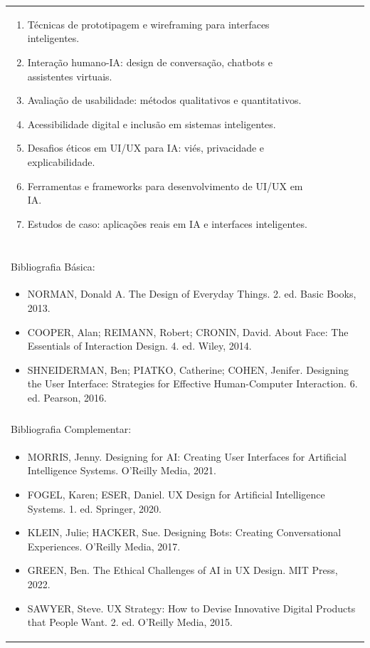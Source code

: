 \documentclass[11pt]{article}
\begin{document}
\begin{center}
\begin{longtable}{|p{4cm}|p{4cm}|p{4cm}|p{4cm}|}
{\begin{enumerate}
\item Técnicas de prototipagem e wireframing para interfaces inteligentes.
\item Interação humano-IA: design de conversação, chatbots e assistentes virtuais.
\item Avaliação de usabilidade: métodos qualitativos e quantitativos.
\item Acessibilidade digital e inclusão em sistemas inteligentes.
\item Desafios éticos em UI/UX para IA: viés, privacidade e explicabilidade.
\item Ferramentas e frameworks para desenvolvimento de UI/UX em IA.
\item Estudos de caso: aplicações reais em IA e interfaces inteligentes.\end{enumerate}}\\
\multicolumn{4}{|p{16cm}|}{}\\
\multicolumn{4}{|p{16cm}|}{}\\
\multicolumn{4}{|p{16cm}|}{\vspace{-1cm}}\\
\multicolumn{4}{|p{16cm}|}{}\\
\hline
\multicolumn{4}{|p{16cm}|}{Bibliografia Básica:}\\
\multicolumn{4}{|p{16cm}|}{%
\begin{itemize}\item NORMAN, Donald A. The Design of Everyday Things. 2. ed. Basic Books, 2013.
\item COOPER, Alan; REIMANN, Robert; CRONIN, David. About Face: The Essentials of Interaction Design. 4. ed. Wiley, 2014.
\item SHNEIDERMAN, Ben; PIATKO, Catherine; COHEN, Jenifer. Designing the User Interface: Strategies for Effective Human-Computer Interaction. 6. ed. Pearson, 2016.\end{itemize}}\\
\multicolumn{4}{|p{16cm}|}{}\\
\hline
\multicolumn{4}{|p{16cm}|}{Bibliografia Complementar:}\\
\multicolumn{4}{|p{16cm}|}{%
\begin{itemize}\item MORRIS, Jenny. Designing for AI: Creating User Interfaces for Artificial Intelligence Systems. O'Reilly Media, 2021.
\item FOGEL, Karen; ESER, Daniel. UX Design for Artificial Intelligence Systems. 1. ed. Springer, 2020.
\item KLEIN, Julie; HACKER, Sue. Designing Bots: Creating Conversational Experiences. O'Reilly Media, 2017.
\item GREEN, Ben. The Ethical Challenges of AI in UX Design. MIT Press, 2022.
\item SAWYER, Steve. UX Strategy: How to Devise Innovative Digital Products that People Want. 2. ed. O'Reilly Media, 2015.\end{itemize}}\\
\hline
\end{longtable}
\end{center}
\end{document}
